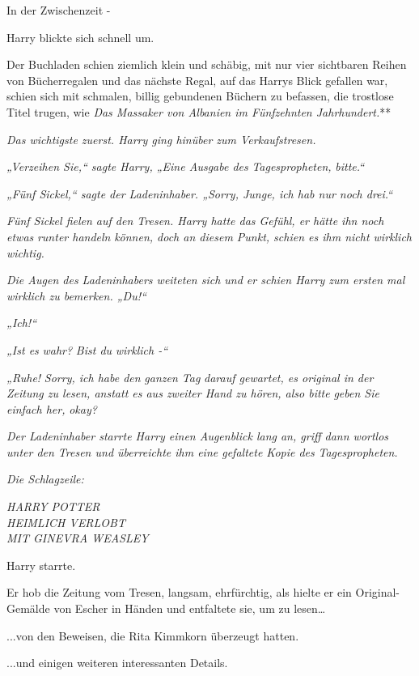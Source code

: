 {In der Zwischenzeit -

Harry blickte sich schnell um.

Der Buchladen schien ziemlich klein und schäbig, mit nur vier sichtbaren Reihen von Bücherregalen und das nächste Regal, auf das Harrys Blick gefallen war, schien sich mit schmalen, billig gebundenen Büchern zu befassen, die trostlose Titel trugen, wie \emph{Das Massaker von Albanien im Fünfzehnten Jahrhundert.}**

\emph{Das wichtigste zuerst. Harry ging hinüber zum Verkaufstresen.}

\emph{„Verzeihen Sie,“ sagte Harry, „Eine Ausgabe des} \emph{\emph{Tagespropheten,}} \emph{bitte.“}

\emph{„Fünf Sickel,“ sagte der Ladeninhaber. „Sorry, Junge, ich hab nur noch drei.“}

\emph{Fünf Sickel fielen auf den Tresen. Harry hatte das Gefühl, er hätte ihn noch etwas} \emph{runter handeln} \emph{können, doch an diesem Punkt, schien es ihm nicht wirklich wichtig.}

\emph{Die Augen des Ladeninhabers weiteten sich und er schien Harry zum ersten mal wirklich zu bemerken. „\emph{Du!}“}

\emph{„\emph{Ich!}“}

\emph{„Ist es} \emph{\emph{wahr?}} \emph{Bist du} \emph{\emph{wirklich -}“}

\emph{„\emph{Ruhe!}} \emph{Sorry, ich habe den} \emph{\emph{ganzen Tag}} \emph{darauf gewartet, es original in der Zeitung zu lesen, anstatt es aus zweiter Hand zu hören, also bitte} \emph{\emph{geben Sie einfach her,}} \emph{okay?}

\emph{Der Ladeninhaber starrte Harry einen Augenblick lang an, griff dann wortlos unter den Tresen und überreichte ihm eine gefaltete Kopie des} \emph{\emph{Tagespropheten.}}

\emph{Die Schlagzeile:}

\emph{HARRY POTTER\\ HEIMLICH VERLOBT\\ MIT GINEVRA WEASLEY}

\hfill\break Harry starrte.

Er hob die Zeitung vom Tresen, langsam, ehrfürchtig, als hielte er ein Original-Gemälde von Escher in Händen und entfaltete sie, um zu lesen…

...von den Beweisen, die Rita Kimmkorn überzeugt hatten.

...und einigen weiteren interessanten Details.

}
